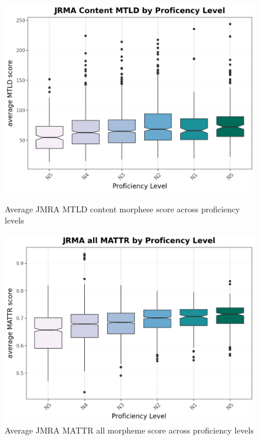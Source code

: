 \begin{figure}[htbp]
    \centering
    \begin{minipage}{.48\textwidth}
        \centering
    \includegraphics[scale=.4]{img/JMRA-MTLDcontent}
    \caption[Average JMRA MTLD content morpheme score across proficiency levels]{Average JMRA MTLD content morphese score across proficiency levels}
        \label{fig:MTLDcontent}
    \end{minipage}
    \hfill
\begin{minipage}{.48\textwidth}
        \centering
        \includegraphics[scale=.4]{img/JMRA-MATTRall}
        \caption[Average JMRA MATTR all morpheme score across proficiency levels]{Average JMRA MATTR all morpheme score across proficiency levels}
\label{fig:MATTRall}
\end{minipage}
    \end{figure}



